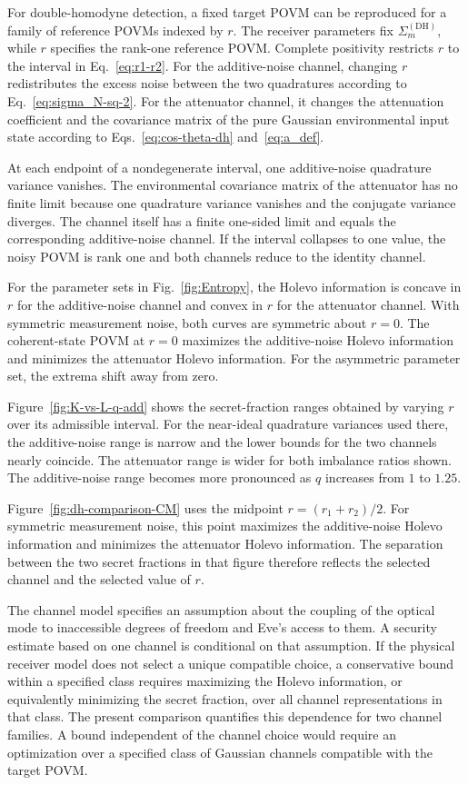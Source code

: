 \documentclass[%
final, 
superscriptaddress,
 amsmath,amssymb,amsfonts,
 aps,
 pra,
 longbibliography,
]{revtex4-2}
\newcommand{\ind}[1]{\mathrm{#1}}
\begin{document}
For double-homodyne detection, a fixed target POVM can be reproduced for a family of reference POVMs indexed by $r$. The receiver parameters fix $\Sigma_m^{(\ind{DH})}$, while $r$ specifies the rank-one reference POVM. Complete positivity restricts $r$ to the interval in Eq.~\eqref{eq:r1-r2}. For the additive-noise channel, changing $r$ redistributes the excess noise between the two quadratures according to Eq.~\eqref{eq:sigma_N-sq-2}. For the attenuator channel, it changes the attenuation coefficient and the covariance matrix of the pure Gaussian environmental input state according to Eqs.~\eqref{eq:cos-theta-dh} and~\eqref{eq:a_def}.

At each endpoint of a nondegenerate interval, one additive-noise quadrature variance vanishes. The environmental covariance matrix of the attenuator has no finite limit because one quadrature variance vanishes and the conjugate variance diverges. The channel itself has a finite one-sided limit and equals the corresponding additive-noise channel. If the interval collapses to one value, the noisy POVM is rank one and both channels reduce to the identity channel.

For the parameter sets in Fig.~\ref{fig:Entropy}, the Holevo information is concave in $r$ for the additive-noise channel and convex in $r$ for the attenuator channel. With symmetric measurement noise, both curves are symmetric about $r=0$. The coherent-state POVM at $r=0$ maximizes the additive-noise Holevo information and minimizes the attenuator Holevo information. For the asymmetric parameter set, the extrema shift away from zero.

Figure~\ref{fig:K-vs-L-q-add} shows the secret-fraction ranges obtained by varying $r$ over its admissible interval. For the near-ideal quadrature variances used there, the additive-noise range is narrow and the lower bounds for the two channels nearly coincide. The attenuator range is wider for both imbalance ratios shown. The additive-noise range becomes more pronounced as $q$ increases from $1$ to $1.25$.

Figure~\ref{fig:dh-comparison-CM} uses the midpoint $r=(r_1+r_2)/2$. For symmetric measurement noise, this point maximizes the additive-noise Holevo information and minimizes the attenuator Holevo information. The separation between the two secret fractions in that figure therefore reflects the selected channel and the selected value of $r$.

The channel model specifies an assumption about the coupling of the optical mode to inaccessible degrees of freedom and Eve's access to them. A security estimate based on one channel is conditional on that assumption. If the physical receiver model does not select a unique compatible choice, a conservative bound within a specified class requires maximizing the Holevo information, or equivalently minimizing the secret fraction, over all channel representations in that class. The present comparison quantifies this dependence for two channel families. A bound independent of the channel choice would require an optimization over a specified class of Gaussian channels compatible with the target POVM.
\end{document}

